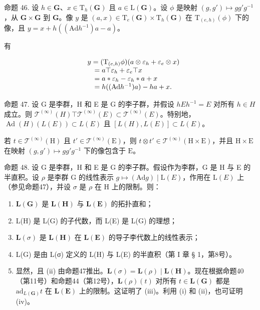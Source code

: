 命题 46. 设 \(h \in \mathbf{G}\)、\(x \in \mathrm{T}_h(\mathbf{G})\) 且 \(a \in \mathrm{L}(\mathbf{G})\)。设 \(\phi\) 是映射 \((g, g') \mapsto gg'g^{-1}\)，从 \(\mathbf{G} \times \mathbf{G}\) 到 \(\mathbf{G}\)。像 \(y\) 是 \((a, x) \in \mathrm{T}_e(\mathbf{G}) \times \mathrm{T}_h(\mathbf{G})\) 在 \(\mathrm{T}_{(e,h)}(\phi)\) 下的像，且 \(y = x + h((\mathrm{Ad}h^{-1})a - a)\)。

有

\[
\begin{array}{r l} & y = (\mathrm{T} _ {(e, h)} \phi) (a \otimes \varepsilon_ {h} + \varepsilon_ {e} \otimes x) \\ & \quad = a \top \varepsilon_ {h} + \varepsilon_ {e} \top x \\ & \quad = a * \varepsilon_ {h} - \varepsilon_ {h} * a + x \\ & \quad = h ((\mathrm{Ad} h ^ {- 1}) a) - h a + x. \end{array}
\]

命题 47. 设 G 是李群，H 和 E 是 G 的李子群，并假设 \(hEh^{-1} = E\) 对所有 \(h \in H\) 成立。则 \(\mathcal{T}^{(\infty)}(H) \top \mathcal{T}^{(\infty)}(E) \subset \mathcal{T}^{(\infty)}(E)\)。特别地，\(\operatorname{Ad}(H)(L(E)) \subset L(E)\) 且 \([L(H), L(E)] \subset L(E)\)。

若 \(t \in \mathcal{T}^{(\infty)}(\mathrm{H})\) 且 \(t' \in \mathcal{T}^{(\infty)}(\mathrm{E})\)，则 \(t \otimes t' \in \mathcal{T}^{(\infty)}(\mathrm{H} \times \mathrm{E})\)，并且 \(\mathrm{H} \times \mathrm{E}\) 在映射 \((g, g') \mapsto gg'g^{-1}\) 下的像包含于 \(\mathrm{E}\)。

命题 48. 设 G 是李群，H 和 E 是 G 的李子群。假设作为李群，G 是 H 与 E 的半直积。设 \(\rho\) 是李群 G 的线性表示 \(g \mapsto (\mathrm{Ad} g) \mid \mathrm{L}(E)\)，作用在 \(\mathrm{L}(E)\) 上（参见命题47），并设 \(\sigma\) 是 \(\rho\) 在 H 上的限制。则：

\begin{enumerate}
\def\labelenumi{(\roman{enumi})}
\item
  \(\mathbf{L}(\mathbf{G})\) 是 \(\mathbf{L}(\mathbf{H})\) 与 \(\mathbf{L}(\mathbf{E})\) 的拓扑直和；
\item
  L(H) 是 L(G) 的子代数，而 L(E) 是 L(G) 的理想；
\item
  \(\mathbf{L}(\sigma)\) 是 \(\mathbf{L}(\mathbf{H})\) 在 \(\mathbf{L}(\mathbf{E})\) 的导子李代数上的线性表示；
\item
  L(G) 是由 L(σ) 定义的 L(H) 与 L(E) 的半直积（第 I 章 § 1，第8号）。
\item
  显然，且 (ii) 由命题47推出。\(\mathbf{L}(\sigma) = \mathbf{L}(\rho) \mid \mathbf{L}(\mathbf{H})\)。现在根据命题40（第11号）和命题44（第12号），\(\mathbf{L}(\rho)(t)\) 对所有 \(t \in \mathbf{L}(\mathbf{G})\) 都是 \(\mathrm{ad}_{L(\mathbf{G})} t\) 在 \(\mathbf{L}(\mathbf{E})\) 上的限制。这证明了 (iii)。利用 (i) 和 (ii)，也可证明 (iv)。
\end{enumerate}

